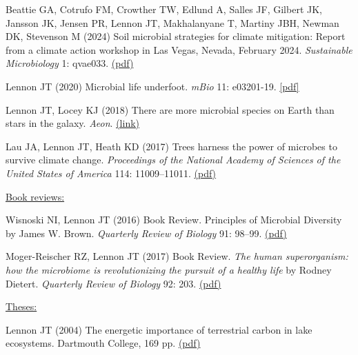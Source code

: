 \documentclass[11pt]{article}
\begin{document}
\begin{etaremune}
\item Beattie GA, Cotrufo FM, Crowther TW, Edlund A, Salles JF, Gilbert JK, Jansson JK, Jensen PR, Lennon JT, Makhalanyane T, Martiny JBH, Newman DK, Stevenson M (2024) Soil microbial strategies for climate mitigation: Report from a climate action workshop in Las Vegas, Nevada, February 2024. \textit{Sustainable Microbiology} 1: qvae033. \href{https://lennonlab.github.io/assets/publications/Beattie_etal_2024.pdf}{(pdf)}

\item Lennon JT (2020) Microbial life underfoot. \textit{mBio} 11: e03201-19. \href{https://lennonlab.github.io/assets/publications/Lennon_2020.pdf}{[pdf]}

\item Lennon JT, Locey KJ (2018) There are more microbial species on Earth than stars in the galaxy. \textit{Aeon}. \href{https://aeon.co/ideas/there-are-more-microbial-species-on-earth-than-stars-in-the-sky}{(link)}

\item Lau JA, Lennon JT, Heath KD (2017) Trees harness the power of microbes to survive climate change. \textit{Proceedings of the National Academy of Sciences of the United States of America} 114: 11009–11011. \href{https://lennonlab.github.io/assets/publications/Lau_etal_2017.pdf}{(pdf)}

\vspace{1em}
\item[] \textnormal{\underline{Book reviews:}}

\item Wisnoski NI, Lennon JT (2016) Book Review. Principles of Microbial Diversity by James W. Brown. \textit{Quarterly Review of Biology} 91: 98–99. \href{https://lennonlab.github.io/assets/publications/Wisnoski_Lennon_2016.pdf}{(pdf)}

\item Moger-Reischer RZ, Lennon JT (2017) Book Review. \textit{The human superorganism: how the microbiome is revolutionizing the pursuit of a healthy life} by Rodney Dietert. \textit{Quarterly Review of Biology} 92: 203. \href{https://lennonlab.github.io/assets/publications/Moger-Reicher_Lennon_2017.pdf}{(pdf)}

\vspace{1em}
\item[] \textnormal{\underline{Theses:}}

\item Lennon JT (2004) The energetic importance of terrestrial carbon in lake ecosystems. Dartmouth College, 169 pp. \href{https://lennonlab.github.io/assets/publications/Lennon_2004_Thesis.pdf}{(pdf)}


\end{etaremune}
\end{document}
